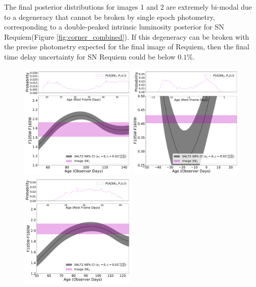 \documentclass[12pt,dvipsnames]{article}
\def\SNABC{SN Requiem\xspace}
\begin{document}
The final posterior distributions for images 1 and 2 are extremely bi-modal due to a degeneracy that cannot be broken by single epoch photometry, corresponding to a double-peaked intrinsic luminosity posterior for \SNABC (Figure \ref{fig:corner_combined}). If this degeneracy can be broken with the precise photometry expected for the final image of Requiem, then the final time delay uncertainty for \SNABC could be below $0.1\%$.


\begin{figure}
    \centering
    \includegraphics[width=0.49\textwidth]{Paper/Figures/colorcurve_image1.pdf}
    \includegraphics[width=0.49\textwidth]{Paper/Figures/colorcurve_image2.pdf}
    \includegraphics[width=0.49\textwidth]{Paper/Figures/colorcurve_image3.pdf}

\end{figure}
\end{document}
